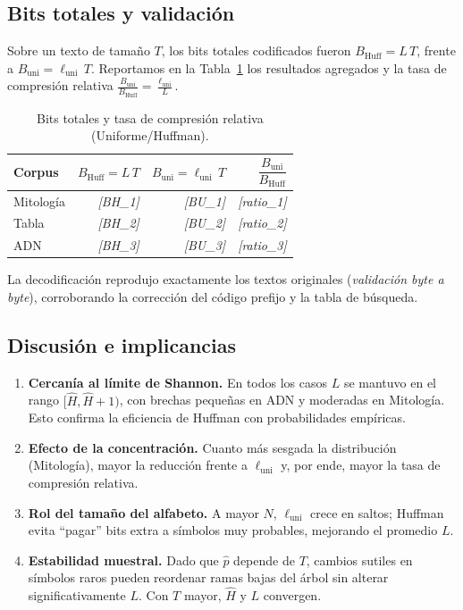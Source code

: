 \documentclass[12pt, a4paper]{article}
\begin{document}
\subsection*{Bits totales y validación}
Sobre un texto de tamaño $T$, los bits totales codificados fueron $B_{\text{Huff}}=L\,T$, frente a $B_{\text{uni}}=\ell_{\text{uni}}\,T$. Reportamos en la Tabla~\ref{tab:bits} los resultados agregados y la tasa de compresión relativa $\frac{B_{\text{uni}}}{B_{\text{Huff}}}=\frac{\ell_{\text{uni}}}{L}$.
%
\begin{table}[h!]
\centering
\caption{Bits totales y tasa de compresión relativa (Uniforme/Huffman).}
\label{tab:bits}
\begin{tabular}{lrrr}
\toprule
\textbf{Corpus} & $B_{\text{Huff}}=L\,T$ & $B_{\text{uni}}=\ell_{\text{uni}}\,T$ & $\dfrac{B_{\text{uni}}}{B_{\text{Huff}}}$ \\
\midrule
Mitología & \emph{[BH\_1]} & \emph{[BU\_1]} & \emph{[ratio\_1]} \\
Tabla     & \emph{[BH\_2]} & \emph{[BU\_2]} & \emph{[ratio\_2]} \\
ADN       & \emph{[BH\_3]} & \emph{[BU\_3]} & \emph{[ratio\_3]} \\
\bottomrule
\end{tabular}
\end{table}

La decodificación reprodujo exactamente los textos originales (\emph{validación byte a byte}), corroborando la corrección del código prefijo y la tabla de búsqueda.

\subsection*{Discusión e implicancias}
\begin{enumerate}
  \item \textbf{Cercanía al límite de Shannon.} En todos los casos $L$ se mantuvo en el rango $[\hat H,\hat H\!+\!1)$, con brechas pequeñas en ADN y moderadas en Mitología. Esto confirma la eficiencia de Huffman con probabilidades empíricas.
  \item \textbf{Efecto de la concentración.} Cuanto más sesgada la distribución (Mitología), mayor la reducción frente a $\ell_{\text{uni}}$ y, por ende, mayor la tasa de compresión relativa. 
  \item \textbf{Rol del tamaño del alfabeto.} A mayor $N$, $\ell_{\text{uni}}$ crece en saltos; Huffman evita “pagar” bits extra a símbolos muy probables, mejorando el promedio $L$.
  \item \textbf{Estabilidad muestral.} Dado que $\hat p$ depende de $T$, cambios sutiles en símbolos raros pueden reordenar ramas bajas del árbol sin alterar significativamente $L$. Con $T$ mayor, $\hat H$ y $L$ convergen.
\end{enumerate}
\end{document}
